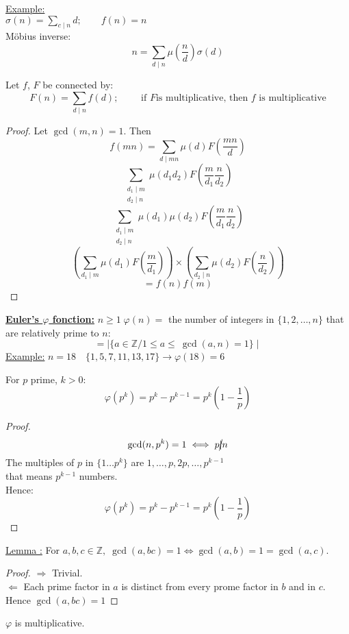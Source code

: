 \documentclass{report}
\begin{document}
\underline{Example:} \\
$\sigma(n) = \sum_{c \mid n} d ; \qquad f(n)=n$\\
M\"{o}bius inverse: \[ n= \sum_{d \mid n} \mu(\frac{n}{d}) \sigma(d)\]
\begin{thm}
				Let $f$, $F$ be connected by:
					\[F(n)=\sum_{d \mid n} f(d) ;\qquad \text{ if }F\text{is multiplicative, then }f\text{ is multiplicative}\]
\end{thm}
\begin{proof}
		Let $\gcd(m,n)=1$. Then 
													\[ f(mn)=\sum_{d \mid mn} \mu(d) F(\frac{mn}{d})\]
													\[\sum_{\substack{d_1 \mid m \\ d_2 \mid n}} \mu(d_1 d_2) F(\frac{m}{d_1} \frac{n}{d_2})\]
													\[\sum_{\substack{d_1 \mid m \\d_2 \mid n}} \mu(d_1) \mu(d_2) F(\frac{m}{d_1} \frac{n}{d_2})\]
													\[(\sum_{d_1 \mid m} \mu(d_1) F(\frac{m}{d_1})) \times (\sum_{d_2 \mid n} \mu(d_2) F(\frac{n}{d_2}))\]
													\[=f(n)f(m)\]
\end{proof}
\textbf{\underline{Euler's $\varphi$ fonction:}} $n\geq 1 \; \varphi(n)=$ the number of integers in $\{1,2,\dots,n\}$ that are relatively prime to $n$:
													\[=\mid \{ a \in \mathbb{Z}/ 1 \leq a \leq \: \gcd(a,n)=1 \} \mid \]
\underline{Example:} $n= 18 \quad \{1,5,7,11,13,17\} \rightarrow \varphi(18)=6$\\
\begin{thm}
				For $p$ prime, $k>0$:
															\[\varphi(p^k)=p^k-p^{k-1}=p^k(1-\frac{1}{p})\]
\end{thm}
\begin{proof}
				\[\gcd(n,p^k)=1 \iff p \cancel{\mid} n\]
				The multiples of $p$ in $\{1 \dots p^k\}$ are $1,\dots, p, 2p, \dots,p^{k-1}$\\
				that means $p^{k-1}$ numbers.\\
				Hence: \[\varphi(p^k) =p^k-p^{k-1}=p^k(1-\frac{1}{p})\]
\end{proof}
\underline{Lemma :} For $a,b,c \in \mathbb{Z},\; \gcd(a,bc)=1 \iff \gcd(a,b)=1=\gcd(a,c)$.
\begin{proof}
		\underline{$\Rightarrow$} Trivial.\\
		\underline{$\Leftarrow$} Each prime factor in $a$ is distinct from every prome factor in $b$ and in $c$. Hence $\gcd(a,bc)=1$
\end{proof}
\begin{thm} $\varphi$ is multiplicative.
\end{thm}
\end{document}
